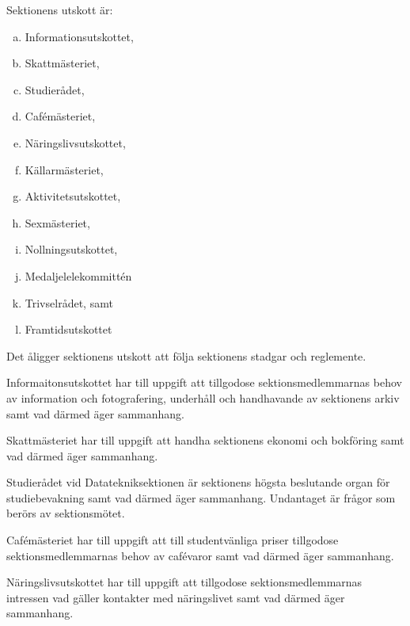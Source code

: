\documentclass[stadgar]{dsekprotokoll}
\begin{document}
\begin{stadgeavsnitt}


Sektionens utskott är:
\begin{enumerate}[a)]
\item Informationsutskottet,
\item Skattmästeriet,
\item Studierådet,
\item Cafémästeriet,
\item Näringslivsutskottet,
\item Källarmästeriet,
\item Aktivitetsutskottet,
\item Sexmästeriet,
\item Nollningsutskottet,
\item Medaljelelekommittén
\item Trivselrådet, samt
\item Framtidsutskottet
\end{enumerate}


Det åligger sektionens utskott att följa sektionens stadgar och
reglemente.


Informaitonsutskottet har till uppgift att tillgodose sektionsmedlemmarnas behov av information och fotografering, underhåll och handhavande av sektionens arkiv samt vad därmed äger sammanhang.


Skattmästeriet har till uppgift att handha sektionens ekonomi och bokföring
samt vad därmed äger sammanhang.


Studierådet vid Datatekniksektionen är sektionens högsta beslutande organ
för studiebevakning samt vad därmed äger sammanhang. Undantaget är frågor
som berörs av sektionsmötet.


Cafémästeriet har till uppgift att till studentvänliga priser tillgodose
sektionsmedlemmarnas behov av cafévaror samt vad därmed äger sammanhang.

Näringslivsutskottet har till uppgift att tillgodose sektionsmedlemmarnas
intressen vad gäller kontakter med näringslivet samt vad därmed äger
sammanhang.


\end{stadgeavsnitt}
\end{document}
